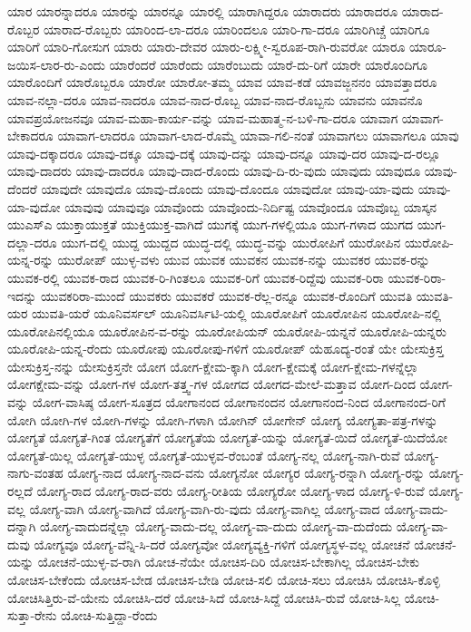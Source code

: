 {ಯಾರ
ಯಾರನ್ನಾದರೂ
ಯಾರನ್ನು
ಯಾರನ್ನೂ
ಯಾರಲ್ಲಿ
ಯಾರಾಗಿದ್ದರೂ
ಯಾರಾದರು
ಯಾರಾದರೂ
ಯಾರಾದ-ರೊಬ್ಬರ
ಯಾರಾದ-ರೊಬ್ಬರು
ಯಾರಿಂದ-ಲಾ-ದರೂ
ಯಾರಿಂದಲೂ
ಯಾರಿ-ಗಾ-ದರೂ
ಯಾರಿಗಿಚ್ಚೆ
ಯಾರಿಗೂ
ಯಾರಿಗೆ
ಯಾರಿ-ಗೋಸುಗ
ಯಾರು
ಯಾರು-ದೇವರ
ಯಾರು-ಲಕ್ಷ್ಮೀ-ಸ್ವರೂಪ-ರಾಗಿ-ರುವರೋ
ಯಾರೂ
ಯಾರೂ-ಜಯಿಸ-ಲಾರ-ರು-ಎಂದು
ಯಾರೆಂದರೆ
ಯಾರೆಂದು
ಯಾರೆಂಬುದು
ಯಾರೆ-ದು-ರಿಗೆ
ಯಾರೇ
ಯಾರೊಂದಿಗೂ
ಯಾರೊಂದಿಗೆ
ಯಾರೊಬ್ಬರೂ
ಯಾರೋ
ಯಾರೋ-ತಮ್ಮ
ಯಾವ
ಯಾವ-ಕಡೆ
ಯಾವಜ್ಜನನಂ
ಯಾವತ್ತಾದರೂ
ಯಾವ-ನಲ್ಲಾ-ದರೂ
ಯಾವ-ನಾದರೂ
ಯಾವ-ನಾದ-ರೊಬ್ಬ
ಯಾವ-ನಾದ-ರೊಬ್ಬನು
ಯಾವನು
ಯಾವನೊ
ಯಾವಪ್ರಯೋಜನವೂ
ಯಾವ-ಮಹಾ-ಕಾರ್ಯ-ವನ್ನು
ಯಾವ-ಮಹಾತ್ಮ-ನ-ಬಳಿ-ಗಾ-ದರೂ
ಯಾವಾಗ
ಯಾವಾಗ-ಬೇಕಾದರೂ
ಯಾವಾಗ-ಲಾದರೂ
ಯಾವಾಗ-ಲಾದ-ರೊಮ್ಮೆ
ಯಾವಾ-ಗಲಿ-ನಂತೆ
ಯಾವಾಗಲು
ಯಾವಾಗಲೂ
ಯಾವು
ಯಾವು-ದಕ್ಕಾದರೂ
ಯಾವು-ದಕ್ಕೂ
ಯಾವು-ದಕ್ಕೆ
ಯಾವು-ದನ್ನು
ಯಾವು-ದನ್ನೂ
ಯಾವು-ದರ
ಯಾವು-ದ-ರಲ್ಲೂ
ಯಾವು-ದಾದರು
ಯಾವು-ದಾದರೂ
ಯಾವು-ದಾದ-ರೊಂದು
ಯಾವು-ದಿ-ರು-ವುದು
ಯಾವುದು
ಯಾವುದೂ
ಯಾವು-ದೆಂದರೆ
ಯಾವುದೇ
ಯಾವುದೊ
ಯಾವು-ದೊಂದು
ಯಾವು-ದೊಂದೂ
ಯಾವುದೋ
ಯಾವು-ಯಾ-ವುದು
ಯಾವು-ಯಾ-ವುದೋ
ಯಾವುವು
ಯಾವುವೂ
ಯಾವೊಂದು
ಯಾವೊಂದು-ನಿರ್ದಿಷ್ಟ
ಯಾವೊಂದೂ
ಯಾವೊಬ್ಬ
ಯಾಸ್ಕನ
ಯುಎಸ್ಎ
ಯುಕ್ತಾಯುಕ್ತತೆ
ಯುಕ್ತಿಯುಕ್ತ-ವಾಗಿದೆ
ಯುಗಕ್ಕೆ
ಯುಗ-ಗಳಲ್ಲಿಯೂ
ಯುಗ-ಗಳಾದ
ಯುಗದ
ಯುಗ-ದಲ್ಲಾ-ದರೂ
ಯುಗ-ದಲ್ಲಿ
ಯುದ್ದ
ಯುದ್ದದ
ಯುದ್ಧ-ದಲ್ಲಿ
ಯುದ್ಧ-ವನ್ನು
ಯುರೋಪಿಗೆ
ಯುರೋಪಿನ
ಯುರೋಪಿ-ಯನ್ನ-ರನ್ನು
ಯುರೋಪ್
ಯುಳ್ಳ-ವಳು
ಯುವ
ಯುವಕ
ಯುವಕನ
ಯುವಕ-ನನ್ನು
ಯುವಕರ
ಯುವಕ-ರನ್ನು
ಯುವಕ-ರಲ್ಲಿ
ಯುವಕ-ರಾದ
ಯುವಕ-ರಿ-ಗಿಂತಲೂ
ಯುವಕ-ರಿಗೆ
ಯುವಕ-ರಿದ್ದೆವು
ಯುವಕ-ರಿರಾ
ಯುವಕ-ರಿರಾ-ಇದನ್ನು
ಯುವಕರಿರಾ-ಮುಂದೆ
ಯುವಕರು
ಯುವಕರೆ
ಯುವಕ-ರೆಲ್ಲ-ರನ್ನೂ
ಯುವಕ-ರೊಂದಿಗೆ
ಯುವತಿ
ಯುವತಿ-ಯರ
ಯುವತಿ-ಯರೆ
ಯೂನಿವರ್ಸಲ್
ಯೂನಿವರ್ಸಿಟಿ-ಯಲ್ಲಿ
ಯೂರೋಪಿಗೆ
ಯೂರೋಪಿನ
ಯೂರೋಪಿ-ನಲ್ಲಿ
ಯೂರೋಪಿನಲ್ಲಿಯೂ
ಯೂರೋಪಿನ-ವ-ರನ್ನು
ಯೂರೋಪಿಯನ್
ಯೂರೋಪಿ-ಯನ್ನನೆ
ಯೂರೋಪಿ-ಯನ್ನರು
ಯೂರೋಪಿ-ಯನ್ನ-ರೆಂದು
ಯೂರೋಪು
ಯೂರೋಪು-ಗಳಿಗೆ
ಯೂರೋಪ್
ಯೆಹೂದ್ಯ-ರಂತೆ
ಯೇ
ಯೇಸುಕ್ರಿಸ್ತ
ಯೇಸುಕ್ರಿಸ್ತ-ನನ್ನು
ಯೇಸುಕ್ರಿಸ್ತನೇ
ಯೋಗ
ಯೋಗ-ಕ್ಷೇಮ-ಕ್ಕಾಗಿ
ಯೋಗ-ಕ್ಷೇಮಕ್ಕೆ
ಯೋಗ-ಕ್ಷೇಮ-ಗಳನ್ನೆಲ್ಲಾ
ಯೋಗಕ್ಷೇಮ-ವನ್ನು
ಯೋಗ-ಗಳ
ಯೋಗ-ತತ್ತ್ವ-ಗಳ
ಯೋಗದ
ಯೋಗದ-ಮೇಲೆ-ಮತ್ತಾವ
ಯೋಗ-ದಿಂದ
ಯೋಗ-ವನ್ನು
ಯೋಗ-ವಾಸಿಷ್ಠ
ಯೋಗ-ಸೂತ್ರದ
ಯೋಗಾನಂದ
ಯೋಗಾನಂದನ
ಯೋಗಾನಂದ-ನಿಂದ
ಯೋಗಾನಂದ-ರಿಗೆ
ಯೋಗಿ
ಯೋಗಿ-ಗಳ
ಯೋಗಿ-ಗಳನ್ನು
ಯೋಗಿ-ಗಳಾಗಿ
ಯೋಗಿನ್
ಯೋಗೇನ್
ಯೋಗ್ಯ
ಯೋಗ್ಯತಾ-ಪತ್ರ-ಗಳನ್ನು
ಯೋಗ್ಯತೆ
ಯೋಗ್ಯತೆ-ಗಿಂತ
ಯೋಗ್ಯತೆಗೆ
ಯೋಗ್ಯತೆಯ
ಯೋಗ್ಯತೆ-ಯನ್ನು
ಯೋಗ್ಯತೆ-ಯಿದೆ
ಯೋಗ್ಯತೆ-ಯಿದೆಯೋ
ಯೋಗ್ಯತೆ-ಯಿಲ್ಲ
ಯೋಗ್ಯತೆ-ಯುಳ್ಳ
ಯೋಗ್ಯತೆ-ಯುಳ್ಳವ-ರೆಂಬಂತೆ
ಯೋಗ್ಯ-ನಲ್ಲ
ಯೋಗ್ಯ-ನಾಗಿ-ರುವೆ
ಯೋಗ್ಯ-ನಾಗು-ವಂತಹ
ಯೋಗ್ಯ-ನಾದ
ಯೋಗ್ಯ-ನಾದ-ವನು
ಯೋಗ್ಯನೋ
ಯೋಗ್ಯರ
ಯೋಗ್ಯ-ರನ್ನಾಗಿ
ಯೋಗ್ಯ-ರನ್ನು
ಯೋಗ್ಯ-ರಲ್ಲದೆ
ಯೋಗ್ಯ-ರಾದ
ಯೋಗ್ಯ-ರಾದ-ವರು
ಯೋಗ್ಯ-ರೀತಿಯ
ಯೋಗ್ಯರೋ
ಯೋಗ್ಯ-ಳಾದ
ಯೋಗ್ಯ-ಳಿ-ರುವೆ
ಯೋಗ್ಯ-ವಲ್ಲ
ಯೋಗ್ಯ-ವಾಗಿ
ಯೋಗ್ಯ-ವಾಗಿದೆ
ಯೋಗ್ಯ-ವಾಗಿ-ರು-ವುದು
ಯೋಗ್ಯ-ವಾಗಿಲ್ಲ
ಯೋಗ್ಯ-ವಾದ
ಯೋಗ್ಯ-ವಾದು-ದನ್ನಾಗಿ
ಯೋಗ್ಯ-ವಾದುದನ್ನೆಲ್ಲಾ
ಯೋಗ್ಯ-ವಾದು-ದಲ್ಲ
ಯೋಗ್ಯ-ವಾ-ದುದು
ಯೋಗ್ಯ-ವಾ-ದುದೆಂದು
ಯೋಗ್ಯ-ವಾ-ದುವು
ಯೋಗ್ಯವೂ
ಯೋಗ್ಯ-ವೆನ್ನಿ-ಸಿ-ದರೆ
ಯೋಗ್ಯವೋ
ಯೋಗ್ಯವ್ಯಕ್ತಿ-ಗಳಿಗೆ
ಯೋಗ್ಯಸ್ಥಳ-ವಲ್ಲ
ಯೋಚನೆ
ಯೋಚನೆ-ಯನ್ನು
ಯೋಚನೆ-ಯುಳ್ಳ-ವ-ರಾಗಿ
ಯೋಚ-ನೆಯೇ
ಯೋಚಿಸ-ದಿರಿ
ಯೋಚಿಸ-ಬೇಕಾಗಿಲ್ಲ
ಯೋಚಿಸ-ಬೇಕು
ಯೋಚಿಸ-ಬೇಕೆಂದು
ಯೋಚಿಸ-ಬೇಡ
ಯೋಚಿಸ-ಬೇಡಿ
ಯೋಚಿ-ಸಲಿ
ಯೋಚಿ-ಸಲು
ಯೋಚಿಸಿ
ಯೋಚಿಸಿ-ಕೊಳ್ಳಿ
ಯೋಚಿಸಿತ್ತಿರು-ವೆ-ಯೇನು
ಯೋಚಿಸಿ-ದರೆ
ಯೋಚಿ-ಸಿದೆ
ಯೋಚಿ-ಸಿದ್ದೆ
ಯೋಚಿಸಿ-ರುವೆ
ಯೋಚಿ-ಸಿಲ್ಲ
ಯೋಚಿ-ಸುತ್ತಾ-ರೇನು
ಯೋಚಿ-ಸುತ್ತಿದ್ದಾ-ರೆಂದು
}

